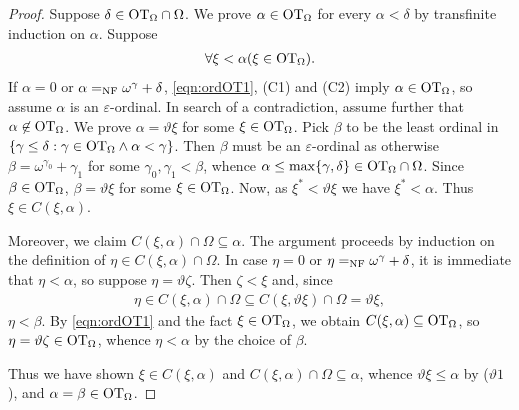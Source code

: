 \documentclass[UKenglish,cleveref,DIV=12]{scrartcl}
\theoremstyle{definition}
\theoremstyle{definition}
\begin{document}
\begin{proof}
Suppose $\delta\in\mathrm{OT}_\Omega\cap\Omega$. We prove $\alpha\in\mathrm{OT}_\Omega$ for every $\alpha<\delta$ by transfinite induction on $\alpha$. Suppose
\begin{align}\label{eqn:ordOT1}
  \forall\xi<\alpha(\xi\in\mathrm{OT}_\Omega).
\end{align}
If $\alpha=0$ or $\alpha=_{\mathrm{NF}}\omega^\gamma+\delta$, \eqref{eqn:ordOT1}, (C1) and (C2) imply $\alpha\in\mathrm{OT}_\Omega$, so assume
$\alpha$ is an $\varepsilon$-ordinal. In search of a contradiction, assume further that $\alpha\not\in\mathrm{OT}_\Omega$. We prove $\alpha=\vartheta\xi$ for some $\xi\in\mathrm{OT}_\Omega$. Pick $\beta$ to be the least ordinal in $\{\gamma\le\delta:\gamma\in\mathrm{OT}_\Omega\land\alpha<\gamma\}$. Then $\beta$ must be an $\varepsilon$-ordinal as otherwise
$\beta=\omega^{\gamma_0}+\gamma_1$ for some $\gamma_0,\gamma_1<\beta$, whence
$\alpha\le\max\{\gamma,\delta\}\in\mathrm{OT}_\Omega\cap\Omega$. Since
$\beta\in\mathrm{OT}_\Omega$, $\beta=\vartheta\xi$ for some $\xi\in\mathrm{OT}_\Omega$. Now, as
$\xi^*<\vartheta\xi$ we have $\xi^*<\alpha$. Thus $\xi\in C(\xi,\alpha)$.

Moreover, we claim $C(\xi,\alpha)\cap\Omega\subseteq\alpha$. The argument proceeds by
induction on the definition of $\eta\in C(\xi,\alpha)\cap\Omega$. In case
$\eta=0$ or $\eta=_{\mathrm{NF}}\omega^\gamma+\delta$, it is immediate that $\eta<\alpha$, so suppose
$\eta=\vartheta\zeta$. Then $\zeta<\xi$ and, since
\begin{align*}
  \eta\in C(\xi,\alpha)\cap\Omega\subseteq C(\xi,\vartheta\xi)\cap\Omega=\vartheta\xi,
\end{align*}
$\eta<\beta$. By \eqref{eqn:ordOT1} and the fact $\xi\in\mathrm{OT}_\Omega$, we obtain $C(\xi,\alpha)\subseteq\mathrm{OT}_\Omega$, so
$\eta=\vartheta\zeta\in\mathrm{OT}_\Omega$, whence $\eta<\alpha$ by the choice of
$\beta$.

Thus we have shown $\xi\in C(\xi,\alpha)$ and $C(\xi,\alpha)\cap\Omega\subseteq \alpha$, whence $\vartheta\xi\le\alpha$ by ($\vartheta1$), and $\alpha=\beta\in\mathrm{OT}_\Omega$.
\end{proof}
\end{document}
